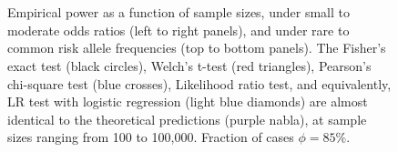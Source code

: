 \begin{figure}[!tpb]
{        }\\ %
        \\ %
\caption{Empirical power as a function of sample sizes, under small to moderate odds ratios (left to right panels), and under rare to common risk allele frequencies (top to bottom panels).
The Fisher's exact test (black circles), Welch's t-test (red triangles), Pearson's chi-square test (blue crosses), Likelihood ratio test, and equivalently, LR test with logistic regression (light blue diamonds) are almost identical to the theoretical predictions (purple nabla), at sample sizes ranging from 100 to 100,000. Fraction of cases $\phi = 85\%$.
}\label{fig:compare-phi085}
\end{figure}

